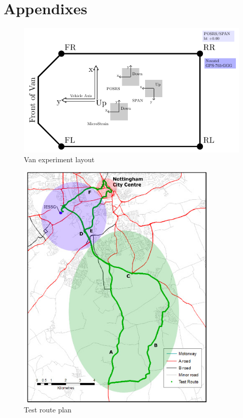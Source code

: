 \documentclass[british]{book}
\begin{document}

\chapter{Appendixes}
\begin{figure}[tbh]
\centering\includegraphics[clip,width=12cm]{pic/VanLayout}%
\caption{Van experiment layout\label{fig:Van-experiment-layout}}
\end{figure}
\begin{figure}[tbh]
\centering\includegraphics[clip,height=12cm]{pic/TrajectoryLayout}%
\caption{Test route plan\label{fig:Van-trajectory}}
\end{figure}
\end{document}
